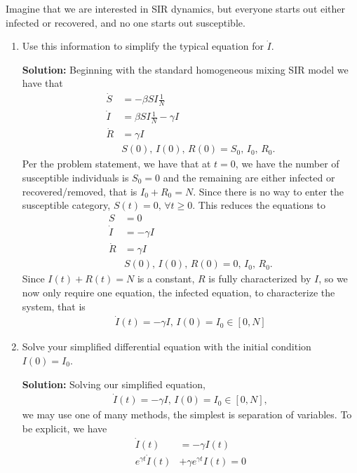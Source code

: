\documentclass[11pt]{article}
\begin{document}
\begin{enumerate}
	Imagine that we are interested in SIR dynamics, but everyone starts out either infected or recovered, and no one starts out susceptible.
	\begin{enumerate}[label=\alph*.]
		\item Use this information to simplify the typical equation for $\dot{I}$.
		\begin{tcolorbox}[breakable]
			\textbf{Solution:}
			Beginning with the standard homogeneous mixing SIR model we have that
			\begin{align*}
				\dot{S} &= -\beta S I\frac{1}{N}\\
				\dot{I} &=\beta S I\frac{1}{N} - \gamma I\\
				\dot{R} &= \gamma I\\
				&S(0), \, I(0), \, R(0)= S_0, \,I_0, \,R_0.
			\end{align*}
			Per the problem statement, we have that at $t=0$, we have the number of susceptible individuals is $S_0=0$ and the remaining are either infected or recovered/removed, that is $I_0+R_0=N$. Since there is no way to enter the susceptible category, $S(t)=0, \, \forall t\geq0$. This reduces the equations to 
			\begin{align*}
				S &= 0\\
				\dot{I} &= - \gamma I\\
				\dot{R} &= \gamma I\\
				&S(0), \, I(0), \, R(0)= 0, \,I_0, \,R_0.
			\end{align*}
			Since $I(t)+R(t)=N$ is a constant, $R$ is fully characterized by $I$, so we now only require one equation, the infected equation, to characterize the system, that is
			\begin{align*}
				\dot{I}(t)=-\gamma I, \, I(0)=I_0 \in [0, N]
			\end{align*}
		\end{tcolorbox}
		\item Solve your simplified differential equation with the initial condition $I(0) = I_0$.
		\begin{tcolorbox}[breakable]
			\textbf{Solution:}
			Solving our simplified equation, 
			\begin{align*}
			\dot{I}(t)=-\gamma I, \, I(0)=I_0 \in [0, N],
			\end{align*}
			we may use one of many methods, the simplest is separation of variables. To be explicit, we have
			\begin{align*}
				\dot{I}(t)&=-\gamma I(t)\\
				e^{\gamma t}\dot{I}(t) &+\gamma e^{\gamma t} I(t)=0\\

\end{align*}
\end{tcolorbox}
\end{enumerate}
\end{enumerate}
\end{document}
